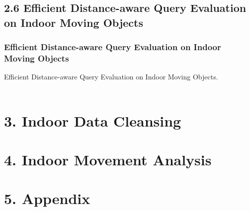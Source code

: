 \documentclass{beamer}
\begin{document}

\subsection{2.6 Efficient Distance-aware Query Evaluation on Indoor Moving Objects} %

\begin{frame}
\frametitle{Efficient Distance-aware Query Evaluation on Indoor Moving Objects}
Efficient Distance-aware Query Evaluation on Indoor Moving Objects.~\cite{DBLP:conf/icde/XieLP13}\\~\\


\end{frame}

\section{3. Indoor Data Cleansing} %

\section{4. Indoor Movement Analysis} %

\section{5. Appendix} %
\end{document}
